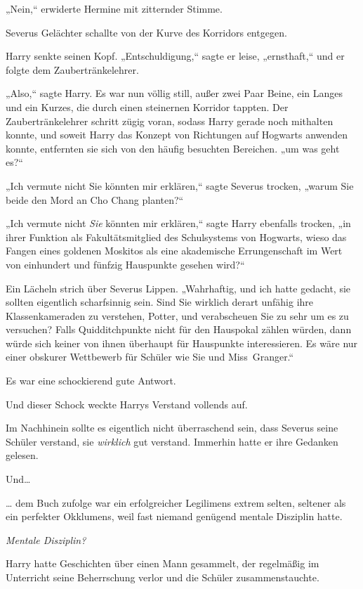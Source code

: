 {„Nein,“ erwiderte Hermine mit zitternder Stimme.

Severus Gelächter schallte von der Kurve des Korridors entgegen.

Harry senkte seinen Kopf. „Entschuldigung,“ sagte er leise, „ernsthaft,“ und er folgte dem Zaubertränkelehrer.

„Also,“ sagte Harry. Es war nun völlig still, außer zwei Paar Beine, ein Langes und ein Kurzes, die durch einen steinernen Korridor tappten. Der Zaubertränkelehrer schritt zügig voran, sodass Harry gerade noch mithalten konnte, und soweit Harry das Konzept von Richtungen auf Hogwarts anwenden konnte, entfernten sie sich von den häufig besuchten Bereichen. „um was geht es?“

„Ich vermute nicht Sie könnten mir erklären,“ sagte Severus trocken, „warum Sie beide den Mord an Cho Chang planten?“

„Ich vermute nicht \emph{Sie} könnten mir erklären,“ sagte Harry ebenfalls trocken, „in ihrer Funktion als Fakultätsmitglied des Schulsystems von Hogwarts, wieso das Fangen eines goldenen Moskitos als eine akademische Errungenschaft im Wert von einhundert und fünfzig Hauspunkte gesehen wird?“

Ein Lächeln strich über Severus Lippen. „Wahrhaftig, und ich hatte gedacht, sie sollten eigentlich scharfsinnig sein. Sind Sie wirklich derart unfähig ihre Klassenkameraden zu verstehen, Potter, und verabscheuen Sie zu sehr um es zu versuchen? Falls Quidditchpunkte nicht für den Hauspokal zählen würden, dann würde sich keiner von ihnen überhaupt für Hauspunkte interessieren. Es wäre nur einer obskurer Wettbewerb für Schüler wie Sie und Miss~Granger.“

Es war eine schockierend gute Antwort.

Und dieser Schock weckte Harrys Verstand vollends auf.

Im Nachhinein sollte es eigentlich nicht überraschend sein, dass Severus seine Schüler verstand, sie \emph{wirklich} gut verstand. Immerhin hatte er ihre Gedanken gelesen.

Und…

… dem Buch zufolge war ein erfolgreicher Legilimens extrem selten, seltener als ein perfekter Okklumens, weil fast niemand genügend mentale Disziplin hatte.

\emph{Mentale Disziplin?}

Harry hatte Geschichten über einen Mann gesammelt, der regelmäßig im Unterricht seine Beherrschung verlor und die Schüler zusammenstauchte.

}

